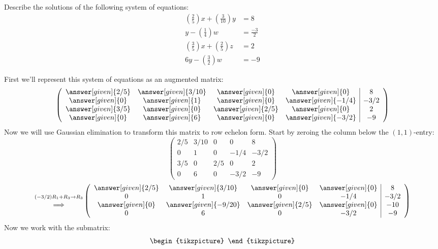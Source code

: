 \documentclass{ximera}
\begin{document}
\begin{example}
  Describe the solutions of the following system of equations:
\begin{align*}
\left(\frac{2}{5}\right)x + \left(\frac{3}{10}\right) y &= 8\\
y -\left(\frac{1}{4}\right)w &= \frac{-3}{2}\\
\left(\frac{3}{5}\right)x + \left(\frac{2}{5}\right)z &= 2\\
6y - \left(\frac{3}{2}\right)w &= -9
\end{align*}
\begin{explanation}
First we'll represent this system of equations as an augmented matrix:
\[
  \left(\begin{array}{cccc|c}
   \answer[given]{2/5}&  \answer[given]{3/10} & \answer[given]{0} &\answer[given]{0} &8 \\
  \answer[given]{0}&  \answer[given]{1} & \answer[given]{0} &\answer[given]{-1/4} & -3/2\\
  \answer[given]{3/5}&  \answer[given]{0} & \answer[given]{2/5} &\answer[given]{0} &2\\
  \answer[given]{0}&  \answer[given]{6} & \answer[given]{0} &\answer[given]{-3/2} &-9
\end{array}\right)
\]
Now we will use Gaussian elimination to transform this matrix to row echelon form. Start by zeroing the column below the $(1,1)$-entry:
\[
\left(\begin{array}{cccc|c}
   {2/5}&  {3/10} & {0} &{0} &8 \\
  {0}&  {1} & {0} &{-1/4} & -3/2\\
  {3/5}&  {0} & {2/5} &{0} &2\\
  {0}&  {6} & {0} &{-3/2} &-9
\end{array}\right)
\]
\[
\begin{matrix}
  \scriptstyle(-3/2) R_1 + R_3\to R_3\\
  \Longrightarrow
\end{matrix}
\left(\begin{array}{cccc|c}
   \answer[given]{2/5}&  \answer[given]{3/10} & \answer[given]{0} &\answer[given]{0} &8 \\
  {0}&  {1} & {0} &{-1/4} & -3/2\\
  \answer[given]{0}&  \answer[given]{-9/20} & \answer[given]{2/5} &\answer[given]{0} &-10\\
  {0}&  {6} & {0} &{-3/2} &-9
\end{array}\right)
\]
Now we work with the submatrix:
\[
\begin{tikzpicture}

\end{tikzpicture}\]
\end{explanation}
\end{example}
\end{document}
